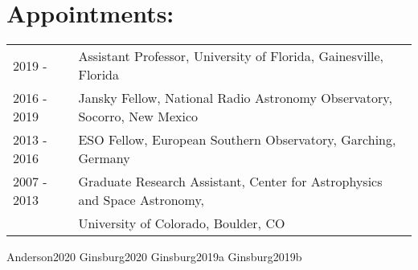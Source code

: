 \documentclass[12pt]{article}
\begin{document}
\section{Appointments:}
\begin{listliketab}
    \begin{tabular}{p{0.8in}p{6.2in}}
    2019 -      & Assistant Professor, University of Florida,  Gainesville, Florida \\
    2016 - 2019 & Jansky Fellow, National Radio Astronomy Observatory, Socorro, New Mexico \\
    2013 - 2016 & ESO Fellow, European Southern Observatory, Garching, Germany \\
    2007 - 2013  & Graduate Research Assistant, Center for Astrophysics and Space Astronomy,\\
     & University of Colorado, Boulder, CO \\
    \end{tabular}
\end{listliketab}


%


%





\nocite{biba}{Anderson2020}
\nocite{biba}{Ginsburg2020}
\nocite{biba}{Ginsburg2019a}
\nocite{biba}{Ginsburg2019b}
\end{document}
